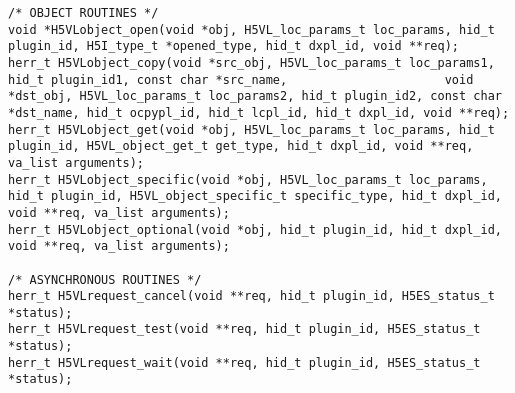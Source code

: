\begin{lstlisting}
/* OBJECT ROUTINES */
void *H5VLobject_open(void *obj, H5VL_loc_params_t loc_params, hid_t plugin_id, H5I_type_t *opened_type, hid_t dxpl_id, void **req);
herr_t H5VLobject_copy(void *src_obj, H5VL_loc_params_t loc_params1, hid_t plugin_id1, const char *src_name,                      void *dst_obj, H5VL_loc_params_t loc_params2, hid_t plugin_id2, const char *dst_name, hid_t ocpypl_id, hid_t lcpl_id, hid_t dxpl_id, void **req);
herr_t H5VLobject_get(void *obj, H5VL_loc_params_t loc_params, hid_t plugin_id, H5VL_object_get_t get_type, hid_t dxpl_id, void **req, va_list arguments);
herr_t H5VLobject_specific(void *obj, H5VL_loc_params_t loc_params, hid_t plugin_id, H5VL_object_specific_t specific_type, hid_t dxpl_id, void **req, va_list arguments);
herr_t H5VLobject_optional(void *obj, hid_t plugin_id, hid_t dxpl_id, void **req, va_list arguments);

/* ASYNCHRONOUS ROUTINES */
herr_t H5VLrequest_cancel(void **req, hid_t plugin_id, H5ES_status_t *status);
herr_t H5VLrequest_test(void **req, hid_t plugin_id, H5ES_status_t *status);
herr_t H5VLrequest_wait(void **req, hid_t plugin_id, H5ES_status_t *status);
\end{lstlisting}

